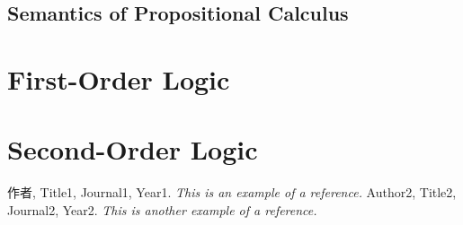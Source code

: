 \documentclass[11pt]{elegantbook}
\begin{document}
\section{Semantics of Propositional Calculus}


\chapter{First-Order Logic}

\chapter{Second-Order Logic}


\begin{thebibliography}{99} 
 作者, Title1, Journal1, Year1. \emph{ This is an example of a reference.}
 Author2, Title2, Journal2, Year2. \emph{ This is another example of a reference.}
\end{thebibliography}
\end{document}
